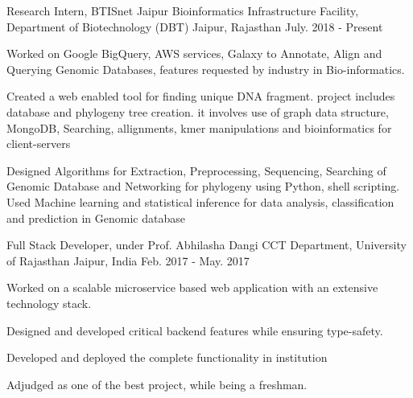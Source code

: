 
\vspace{-0.2cm}


\begin{cventries}


  \cventry
  {Research Intern, BTISnet Jaipur}
  {Bioinformatics Infrastructure Facility, Department of Biotechnology (DBT)}
  {Jaipur, Rajasthan}
  {July. 2018 - Present}
  {
    \begin{cvitems}
    \item {Worked on Google BigQuery, AWS services, Galaxy to Annotate, Align and Querying Genomic Databases, features requested by industry in Bio-informatics.}
    \item {Created a web enabled tool for finding unique DNA fragment. project includes database and phylogeny tree creation. it involves use of graph data structure, MongoDB, Searching, allignments, kmer manipulations and bioinformatics for client-servers }
    \item {Designed Algorithms for Extraction, Preprocessing, Sequencing, Searching of Genomic Database and Networking for phylogeny using Python, shell scripting. Used Machine learning and statistical inference for data analysis, classification and prediction in Genomic database}
    \end{cvitems}
  }


  \cventry
  {Full Stack Developer, under Prof. Abhilasha Dangi}
  {CCT Department, University of Rajasthan}
  {Jaipur, India}
  {Feb. 2017 - May. 2017}
  {
    \begin{cvitems}
    \item Worked on a scalable microservice based web application with an extensive technology stack.
    \item Designed and developed critical backend features while
      ensuring type-safety.
    \item Developed and deployed the complete functionality in institution
    \item Adjudged as one of the best project, while being a freshman.
    \end{cvitems}
  }

\end{cventries}

